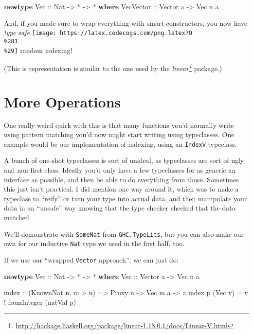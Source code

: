 \documentclass[]{article}
\newenvironment{Shaded}{\begin{snugshade}}{\end{snugshade}}
\newcommand{\DataTypeTok}[1]{\textcolor[rgb]{0.13,0.29,0.53}{#1}}
\newcommand{\FunctionTok}[1]{\textcolor[rgb]{0.00,0.00,0.00}{#1}}
\newcommand{\KeywordTok}[1]{\textcolor[rgb]{0.13,0.29,0.53}{\textbf{#1}}}
\newcommand{\NormalTok}[1]{#1}
\newcommand{\OtherTok}[1]{\textcolor[rgb]{0.56,0.35,0.01}{#1}}
\renewcommand{\href}[2]{#2\footnote{\url{#1}}}
\begin{document}
\begin{Shaded}
\begin{Highlighting}[]
\KeywordTok{newtype} \DataTypeTok{Vec}\OtherTok{ ::} \DataTypeTok{Nat} \OtherTok{->} \FunctionTok{*} \OtherTok{->} \FunctionTok{*} \KeywordTok{where}
    \DataTypeTok{VecVector}\OtherTok{ ::} \DataTypeTok{Vector}\NormalTok{ a }\OtherTok{->} \DataTypeTok{Vec}\NormalTok{ n a}
\end{Highlighting}
\end{Shaded}

And, if you made sure to wrap everything with smart constructors, you now have
\emph{type safe}
\texttt{[image: https://latex.codecogs.com/png.latex?O\\\%281\\\%29]} random
indexing!

(This is representation is similar to the one used by the
\emph{\href{http://hackage.haskell.org/package/linear-1.18.0.1/docs/Linear-V.html}{linear}}
package.)

\hypertarget{more-operations}{%
\section{More Operations}\label{more-operations}}

One really weird quirk with this is that many functions you'd normally write
using pattern matching you'd now might start writing using typeclasses. One
example would be our implementation of indexing, using an \texttt{IndexV}
typeclass.

A bunch of one-shot typeclasses is sort of unideal, as typeclasses are sort of
ugly and non-first-class. Ideally you'd only have a few typeclasses for as
generic an interface as possible, and then be able to do everything from those.
Sometimes this just isn't practical. I did mention one way around it, which was
to make a typeclass to ``reify'' or turn your type into actual data, and then
manipulate your data in an ``unsafe'' way knowing that the type checker checked
that the data matched.

We'll demonstrate with \texttt{SomeNat} from \texttt{GHC.TypeLits}, but you can
also make our own for our inductive \texttt{Nat} type we used in the first half,
too.

If we use our ``wrapped \texttt{Vector} approach'', we can just do:

\begin{Shaded}
\begin{Highlighting}[]
\KeywordTok{newtype} \DataTypeTok{Vec}\OtherTok{ ::} \DataTypeTok{Nat} \OtherTok{->} \FunctionTok{*} \OtherTok{->} \FunctionTok{*} \KeywordTok{where}
    \DataTypeTok{Vec}\OtherTok{ ::} \DataTypeTok{Vector}\NormalTok{ a }\OtherTok{->} \DataTypeTok{Vec}\NormalTok{ n a}

\NormalTok{index}\OtherTok{ ::}\NormalTok{ (}\DataTypeTok{KnownNat}\NormalTok{ n, m }\FunctionTok{>}\NormalTok{ n) }\OtherTok{=>} \DataTypeTok{Proxy}\NormalTok{ n }\OtherTok{->} \DataTypeTok{Vec}\NormalTok{ m a }\OtherTok{->}\NormalTok{ a}
\NormalTok{index p (}\DataTypeTok{Vec}\NormalTok{ v) }\FunctionTok{=}\NormalTok{ v }\FunctionTok{!}\NormalTok{ fromInteger (natVal p)}
\end{Highlighting}
\end{Shaded}
\end{document}
